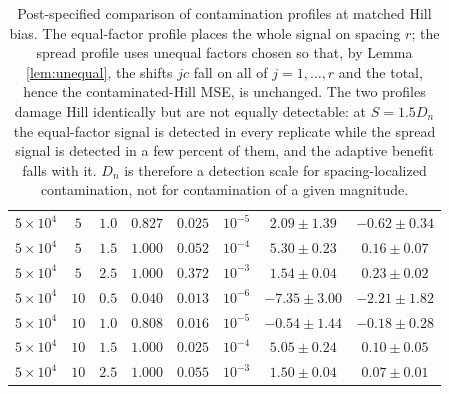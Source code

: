 \begin{table}[H]
\begin{tabular}{cccccccc}
$5{\times}10^4$ & $5$ & $1.0$ & $0.827$ & $0.025$ & $10^{-5}$ & $2.09\pm1.39$ & $-0.62\pm0.34$\\
$5{\times}10^4$ & $5$ & $1.5$ & $1.000$ & $0.052$ & $10^{-4}$ & $5.30\pm0.23$ & $0.16\pm0.07$\\
$5{\times}10^4$ & $5$ & $2.5$ & $1.000$ & $0.372$ & $10^{-3}$ & $1.54\pm0.04$ & $0.23\pm0.02$\\
$5{\times}10^4$ & $10$ & $0.5$ & $0.040$ & $0.013$ & $10^{-6}$ & $-7.35\pm3.00$ & $-2.21\pm1.82$\\
$5{\times}10^4$ & $10$ & $1.0$ & $0.808$ & $0.016$ & $10^{-5}$ & $-0.54\pm1.44$ & $-0.18\pm0.28$\\
$5{\times}10^4$ & $10$ & $1.5$ & $1.000$ & $0.025$ & $10^{-4}$ & $5.05\pm0.24$ & $0.10\pm0.05$\\
$5{\times}10^4$ & $10$ & $2.5$ & $1.000$ & $0.055$ & $10^{-3}$ & $1.50\pm0.04$ & $0.07\pm0.01$\\
\bottomrule
\end{tabular}
\caption{Post-specified comparison of contamination profiles at matched Hill bias.  The equal-factor profile places the whole signal on spacing $r$; the spread profile uses unequal factors chosen so that, by Lemma \ref{lem:unequal}, the shifts $jc$ fall on all of $j=1,\ldots,r$ and the total, hence the contaminated-Hill MSE, is unchanged.  The two profiles damage Hill identically but are not equally detectable: at $S=1.5D_n$ the equal-factor signal is detected in every replicate while the spread signal is detected in a few percent of them, and the adaptive benefit falls with it.  $D_n$ is therefore a detection scale for spacing-localized contamination, not for contamination of a given magnitude.}
\label{tab:stress-profile}
\end{table}
